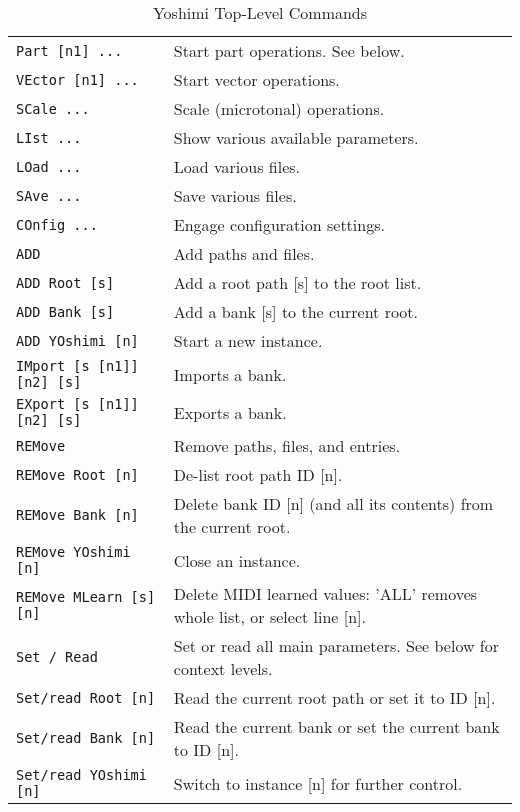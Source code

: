    \begin{table}[H]
      \centering
      \caption{Yoshimi Top-Level Commands}
      \label{table:yoshimi_text_toplevel_commands}
      \begin{tabular}{l l}

\texttt{Part [n1] ...} &
   Start part operations.  See below. \\
\texttt{VEctor [n1] ...} &
   Start vector operations. \\
\texttt{SCale ...} &
   Scale (microtonal) operations. \\
\texttt{LIst ...} &
   Show various available parameters. \\
\texttt{LOad ...} &
   Load various files. \\
\texttt{SAve ...} &
   Save various files. \\
\texttt{COnfig ...} &
   Engage configuration settings. \\
\texttt{ADD} &
   Add paths and files. \\
\texttt{ADD Root [s]} &
   Add a root path [s] to the root list. \\
\texttt{ADD Bank [s]} &
   Add a bank [s] to the current root. \\
\texttt{ADD YOshimi [n]} &
   Start a new instance. \\
\texttt{IMport [s [n1]] [n2] [s]} &
   Imports a bank. \\
\texttt{EXport [s [n1]] [n2] [s]} &
   Exports a bank. \\
\texttt{REMove} &
   Remove paths, files, and entries. \\
\texttt{REMove Root [n]} &
   De-list root path ID [n]. \\
\texttt{REMove Bank [n]} &
   Delete bank ID [n] (and all its contents) from the current root. \\
\texttt{REMove YOshimi [n]} &
   Close an instance. \\
\texttt{REMove MLearn [s] [n]} &
   Delete MIDI learned values: 'ALL' removes whole list, or select line [n]. \\
\texttt{Set / Read} &
   Set or read all main parameters. See below for context levels. \\
\texttt{Set/read Root [n]} &
   Read the current root path or set it to ID [n]. \\
\texttt{Set/read Bank [n]} &
   Read the current bank or set the current bank to ID [n]. \\
\texttt{Set/read YOshimi [n]}&
   Switch to instance [n] for further control. \\

\end{tabular}
\end{table}
